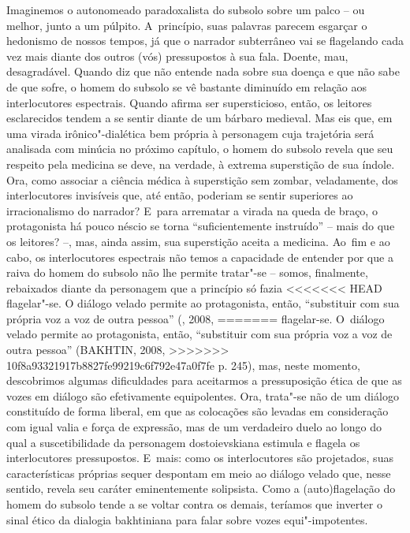 {Imaginemos o autonomeado paradoxalista do subsolo sobre um palco -- ou
melhor, junto a um púlpito. A~princípio, suas palavras parecem esgarçar
o hedonismo de nossos tempos, já que o narrador subterrâneo vai se
flagelando cada vez mais diante dos outros (vós) pressupostos à sua
fala. Doente, mau, desagradável. Quando diz que não entende nada sobre
sua doença e que não sabe de que sofre, o homem do subsolo se vê
bastante diminuído em relação aos interlocutores espectrais. Quando
afirma ser supersticioso, então, os leitores esclarecidos tendem a se
sentir diante de um bárbaro medieval. Mas eis que, em uma virada
irônico"-dialética bem própria à personagem cuja trajetória será
analisada com minúcia no próximo capítulo, o homem do subsolo revela que
seu respeito pela medicina se deve, na verdade, à extrema superstição de
sua índole. Ora, como associar a ciência médica à superstição sem
zombar, veladamente, dos interlocutores invisíveis que, até então,
poderiam se sentir superiores ao irracionalismo do narrador? E~para
arrematar a virada na queda de braço, o protagonista há pouco néscio se
torna ``suficientemente instruído'' -- mais do que os leitores? --, mas,
ainda assim, sua superstição aceita a medicina. Ao~fim e ao cabo, os
interlocutores espectrais não temos a capacidade de entender por que a
raiva do homem do subsolo não lhe permite tratar"-se -- somos,
finalmente, rebaixados diante da personagem que a princípio só fazia
<<<<<<< HEAD
flagelar"-se. O diálogo velado permite ao protagonista, então,
``substituir com sua própria voz a voz de outra pessoa'' (, 2008,
=======
flagelar-se. O~diálogo velado permite ao protagonista, então,
``substituir com sua própria voz a voz de outra pessoa'' (BAKHTIN, 2008,
>>>>>>> 10f8a93321917b8827fe99219c6f792e47a0f7fe
p. 245), mas, neste momento, descobrimos algumas dificuldades para
aceitarmos a pressuposição ética de que as vozes em diálogo são
efetivamente equipolentes. Ora, trata"-se não de um diálogo constituído
de forma liberal, em que as colocações são levadas em consideração com
igual valia e força de expressão, mas de um verdadeiro duelo ao longo do
qual a suscetibilidade da personagem dostoievskiana estimula e flagela
os interlocutores pressupostos. E~mais: como os interlocutores são
projetados, suas características próprias sequer despontam em meio ao
diálogo velado que, nesse sentido, revela seu caráter eminentemente
solipsista. Como a (auto)flagelação do homem do subsolo tende a se
voltar contra os demais, teríamos que inverter o sinal ético da dialogia
bakhtiniana para falar sobre vozes equi"-impotentes.

}
